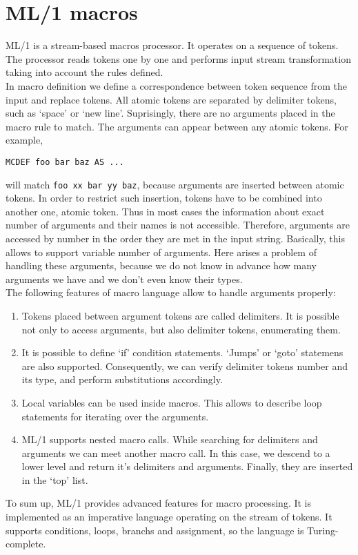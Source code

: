 \section{ML/1 macros}
ML/1 is a stream-based macros processor\cite{mli}. It operates on a sequence of
tokens.  The processor reads tokens one by one and performs input stream
transformation taking into account the rules defined. \\ 
In macro definition we define a correspondence between token sequence from the
input and replace tokens. All atomic tokens are separated by delimiter tokens,
such as `space' or `new line'. Suprisingly, there are no arguments placed in
the macro rule to match. The arguments can appear between any atomic tokens.
For example, 
\begin{verbatim}
MCDEF foo bar baz AS ...
\end{verbatim}
will match \verb|foo xx bar yy baz|, because arguments are inserted between
atomic tokens. In order to restrict such insertion, tokens have to be combined
into another one, atomic token. Thus in most cases the information about exact
number of arguments and their names is not accessible. Therefore, arguments are
accessed by number in the order they are met in the input string. Basically,
this allows to support variable number of arguments. Here arises a problem of
handling these arguments, because we do not know in advance how many arguments
we have and we don't even know their types.  \\
The following features of macro language allow to handle arguments properly:
\begin{enumerate}
    \item Tokens placed between argument tokens are called delimiters. It is
    possible not only to access arguments, but also delimiter tokens,
    enumerating them.
    \item It is possible to define `if' condition statements. `Jumps' or `goto'
    statemens are also supported. Consequently, we can verify delimiter tokens
    number and its type, and perform substitutions accordingly.
    \item Local variables can be used inside macros. This allows to describe
    loop statements for iterating over the arguments.
    \item ML/1 supports nested macro calls. While searching for delimiters and
    arguments we can meet another macro call. In this case, we descend to a
    lower level and return it's delimiters and arguments. Finally, they are
    inserted in the `top' list.
\end{enumerate}
To sum up, ML/1 provides advanced features for macro processing. It is
implemented as an imperative language operating on the stream of tokens.  It
supports conditions, loops, branchs and assignment, so the language is
Turing-complete.
